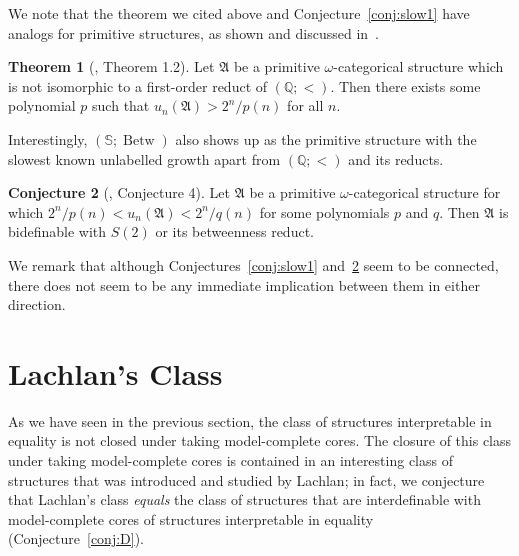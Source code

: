\documentclass{amsart}
\theoremstyle{definition}
\newtheorem{theorem}{Theorem}[section]
\newtheorem{conjecture}[theorem]{Conjecture}
\theoremstyle{remark}
\newtheorem{remark}[theorem]{Remark}
\numberwithin{equation}{section}
\newcommand{\order}{(\mathbb{Q};<)}
\newcommand{\betw}{\operatorname{Betw}}
\newcommand{\fa}{\mathfrak{A}}
\newcommand{\cc}{\mathbb{S}}
\begin{document}
    	We note that the theorem we cited above and Conjecture~\ref{conj:slow1} have analogs for primitive structures, as shown and discussed in~\cite{braunfeld2022monadic}. 
	
\begin{theorem}[\cite{braunfeld2022monadic}, Theorem 1.2]
	Let $\fa$ be a primitive $\omega$-categorical structure which is not isomorphic to a first-order reduct of $\order$. Then there exists some polynomial $p$ such that $u_n(\fa)>2^n/p(n)$ for all $n$.
\end{theorem}

	Interestingly, $(\cc;\betw)$ also shows up as the primitive structure with the slowest known unlabelled growth apart from $\order$ and
    its reducts.

\begin{conjecture}[\cite{braunfeld2022monadic}, Conjecture 4]\label{conj:slow2}
	Let $\fa$ be a primitive $\omega$-categorical structure for which $2^n/p(n)<u_n(\fa)<2^n/q(n)$ for some polynomials $p$ and $q$. Then $\fa$ is bidefinable with $S(2)$ or its betweenness reduct.
\end{conjecture}

	We remark that although Conjectures~\ref{conj:slow1} and~\ref{conj:slow2} seem to be connected, there does not seem to be any immediate implication between them in either direction.



\section{Lachlan's Class}
\label{sect:lachlan}
As we have seen in the previous section, 
the class of structures interpretable in equality is not closed under taking model-complete cores. The closure of this class under taking model-complete cores is contained in an interesting class of structures that was introduced and studied by Lachlan; in fact, we conjecture that Lachlan's class \emph{equals} the 
{class of structures that are interdefinable with} model-complete cores of structures interpretable in equality (Conjecture~\ref{conj:D}).
\end{document}
